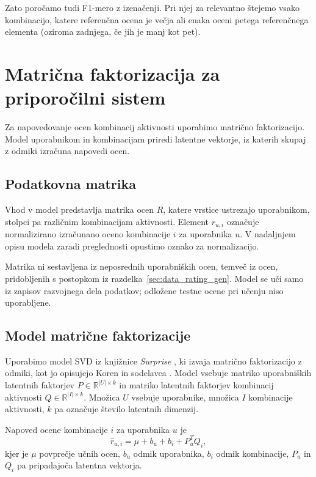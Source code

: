 \documentclass[a4paper,twoside,openright,12pt,slovene]{book}
\begin{document}
Zato poročamo tudi F1-mero z izenačenji. Pri njej za relevantno
štejemo vsako kombinacijo, katere referenčna ocena je večja ali
enaka oceni petega referenčnega elementa (oziroma zadnjega,
če jih je manj kot pet).





\section{Matrična faktorizacija za priporočilni sistem} \label{sec:matrix_factorization}
Za napovedovanje ocen kombinacij aktivnosti uporabimo matrično
faktorizacijo. Model uporabnikom in kombinacijam priredi latentne
vektorje, iz katerih skupaj z odmiki izračuna napovedi ocen.

\subsection{Podatkovna matrika}

Vhod v model predstavlja matrika ocen $R$, katere vrstice ustrezajo
uporabnikom, stolpci pa različnim kombinacijam aktivnosti.
Element $r_{u,i}$ označuje normalizirano izračunano oceno
kombinacije $i$ za uporabnika $u$. V nadaljnjem opisu modela zaradi
preglednosti opustimo oznako za normalizacijo.

Matrika ni sestavljena iz neposrednih uporabniških ocen,
temveč iz ocen, pridobljenih s postopkom iz
razdelka~\ref{sec:data_rating_gen}. Model se uči samo iz zapisov
razvojnega dela podatkov; odložene testne ocene pri učenju
niso uporabljene.

\subsection{Model matrične faktorizacije}

Uporabimo model SVD iz knjižnice \textit{Surprise}
\cite{hug2020surprise}, ki izvaja matrično faktorizacijo z odmiki,
kot jo opisujejo Koren in sodelavca \cite{koren2009matrix}.
Model vsebuje matriko uporabniških latentnih faktorjev
$P \in \mathbb{R}^{|U|\times k}$ in matriko latentnih faktorjev
kombinacij aktivnosti $Q \in \mathbb{R}^{|I|\times k}$.
Množica $U$ vsebuje uporabnike, množica $I$ kombinacije aktivnosti,
$k$ pa označuje število latentnih dimenzij.

Napoved ocene kombinacije $i$ za uporabnika $u$ je
\[
\hat{r}_{u,i} = \mu + b_u + b_i + P_u^T Q_i,
\]
kjer je $\mu$ povprečje učnih ocen, $b_u$ odmik uporabnika,
$b_i$ odmik kombinacije, $P_u$ in $Q_i$ pa pripadajoča
latentna vektorja.
\end{document}
